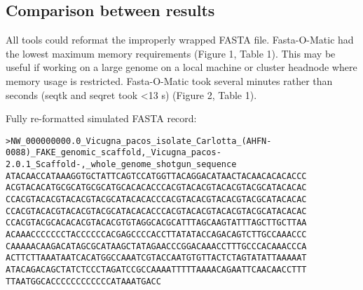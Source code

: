 \subsection{Comparison between results}

All tools could reformat the improperly wrapped FASTA file. Fasta-O-Matic had the lowest maximum memory requirements (Figure 1, Table 1). This may be useful if working on a large genome on a local machine or cluster headnode where memory usage is restricted. Fasta-O-Matic took several minutes rather than seconds (seqtk and seqret took <13 s) (Figure 2, Table 1). 

Fully re-formatted simulated FASTA record:
\begin{verbatim}
>NW_000000000.0_Vicugna_pacos_isolate_Carlotta_(AHFN-0088)_FAKE_genomic_scaffold,_Vicugna_pacos-2.0.1_Scaffold-,_whole_genome_shotgun_sequence
ATACAACCATAAAGGTGCTATTCAGTCCATGGTTACAGGACATAACTACAACACACACCC
ACGTACACATGCGCATGCGCATGCACACACCCACGTACACGTACACGTACGCATACACAC
CCACGTACACGTACACGTACGCATACACACCCACGTACACGTACACGTACGCATACACAC
CCACGTACACGTACACGTACGCATACACACCCACGTACACGTACACGTACGCATACACAC
CCACGTACGCACACACGTACACGTGTAGGCACGCATTTAGCAAGTATTTAGCTTGCTTAA
ACAAACCCCCCCTACCCCCCACGAGCCCCACCTTATATACCAGACAGTCTTGCCAAACCC
CAAAAACAAGACATAGCGCATAAGCTATAGAACCCGGACAAACCTTTGCCCACAAACCCA
ACTTCTTAAATAATCACATGGCCAAATCGTACCAATGTGTTACTCTAGTATATTAAAAAT
ATACAGACAGCTATCTCCCTAGATCCGCCAAAATTTTTAAAACAGAATTCAACAACCTTT
TTAATGGCACCCCCCCCCCCCATAAATGACC
\end{verbatim}
  
  
  
  
  
  
  
  